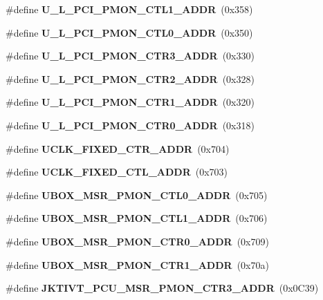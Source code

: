 \begin{DoxyCompactItemize}
\mbox{\label{types_8h_a1a138aef5bf1e39e260ec380cc62b0c8}} 
\#define {\bfseries U\+\_\+\+L\+\_\+\+P\+C\+I\+\_\+\+P\+M\+O\+N\+\_\+\+C\+T\+L1\+\_\+\+A\+D\+DR}~(0x358)
\item 
\mbox{\label{types_8h_a9d7227bf5308dec5a849febfd42fa581}} 
\#define {\bfseries U\+\_\+\+L\+\_\+\+P\+C\+I\+\_\+\+P\+M\+O\+N\+\_\+\+C\+T\+L0\+\_\+\+A\+D\+DR}~(0x350)
\item 
\mbox{\label{types_8h_a4fc1f0ea808bdc24621d1ccb1c186d0b}} 
\#define {\bfseries U\+\_\+\+L\+\_\+\+P\+C\+I\+\_\+\+P\+M\+O\+N\+\_\+\+C\+T\+R3\+\_\+\+A\+D\+DR}~(0x330)
\item 
\mbox{\label{types_8h_aa5a7457fd401e8b1a4bb2777c6619ea5}} 
\#define {\bfseries U\+\_\+\+L\+\_\+\+P\+C\+I\+\_\+\+P\+M\+O\+N\+\_\+\+C\+T\+R2\+\_\+\+A\+D\+DR}~(0x328)
\item 
\mbox{\label{types_8h_acfcb4b4bbc20c1c05216e0b123cfe22d}} 
\#define {\bfseries U\+\_\+\+L\+\_\+\+P\+C\+I\+\_\+\+P\+M\+O\+N\+\_\+\+C\+T\+R1\+\_\+\+A\+D\+DR}~(0x320)
\item 
\mbox{\label{types_8h_a06fe64c0476810ce5b61528fdb3f41ed}} 
\#define {\bfseries U\+\_\+\+L\+\_\+\+P\+C\+I\+\_\+\+P\+M\+O\+N\+\_\+\+C\+T\+R0\+\_\+\+A\+D\+DR}~(0x318)
\item 
\mbox{\label{types_8h_a5ef858f824bc131f9d4a8045f8d45f62}} 
\#define {\bfseries U\+C\+L\+K\+\_\+\+F\+I\+X\+E\+D\+\_\+\+C\+T\+R\+\_\+\+A\+D\+DR}~(0x704)
\item 
\mbox{\label{types_8h_a318c4bebd4c59afaef9fbe28355561f1}} 
\#define {\bfseries U\+C\+L\+K\+\_\+\+F\+I\+X\+E\+D\+\_\+\+C\+T\+L\+\_\+\+A\+D\+DR}~(0x703)
\item 
\mbox{\label{types_8h_a7b6336379e37948b6a26a74b44595c70}} 
\#define {\bfseries U\+B\+O\+X\+\_\+\+M\+S\+R\+\_\+\+P\+M\+O\+N\+\_\+\+C\+T\+L0\+\_\+\+A\+D\+DR}~(0x705)
\item 
\mbox{\label{types_8h_acf5ccf3b400df187d2be2aa733e0715d}} 
\#define {\bfseries U\+B\+O\+X\+\_\+\+M\+S\+R\+\_\+\+P\+M\+O\+N\+\_\+\+C\+T\+L1\+\_\+\+A\+D\+DR}~(0x706)
\item 
\mbox{\label{types_8h_ad2b5814f9397ce7e9805757b0def8dfd}} 
\#define {\bfseries U\+B\+O\+X\+\_\+\+M\+S\+R\+\_\+\+P\+M\+O\+N\+\_\+\+C\+T\+R0\+\_\+\+A\+D\+DR}~(0x709)
\item 
\mbox{\label{types_8h_aeaffb96a3b64d60d4797b3d45a521b2e}} 
\#define {\bfseries U\+B\+O\+X\+\_\+\+M\+S\+R\+\_\+\+P\+M\+O\+N\+\_\+\+C\+T\+R1\+\_\+\+A\+D\+DR}~(0x70a)
\item 
\mbox{\label{types_8h_a94e80e664b4d2b604128bef0be06fe10}} 
\#define {\bfseries J\+K\+T\+I\+V\+T\+\_\+\+P\+C\+U\+\_\+\+M\+S\+R\+\_\+\+P\+M\+O\+N\+\_\+\+C\+T\+R3\+\_\+\+A\+D\+DR}~(0x0\+C39)

\end{DoxyCompactItemize}
